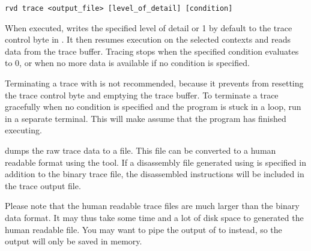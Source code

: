 \begin{lstlisting}[numbers=none, language=nothing]
rvd trace <output_file> [level_of_detail] [condition]
\end{lstlisting}

\noindent When executed,  writes the specified level of detail or 1
by default to the trace control byte in . It then resumes execution
on the selected contexts and reads data from the trace buffer. Tracing stops
when the specified condition evaluates to 0, or when no more data is available
if no condition is specified.

Terminating a trace with  is not recommended, because it prevents
 from resetting the trace control byte and emptying the trace buffer.
To terminate a trace gracefully when no condition is specified and the program
is stuck in a loop, run  in a separate terminal. This will make
 assume that the program has finished executing.

 dumps the raw trace data to a file. This file can be converted
to a human readable format using the  tool. If a disassembly file
generated using  is specified in addition to the binary trace
file, the disassembled instructions will be included in the trace output file.

Please note that the human readable trace files are much larger than the binary
data format. It may thus take some time and a lot of disk space to generated the
human readable file. You may want to pipe the output of  to
 instead, so the output will only be saved in memory.

